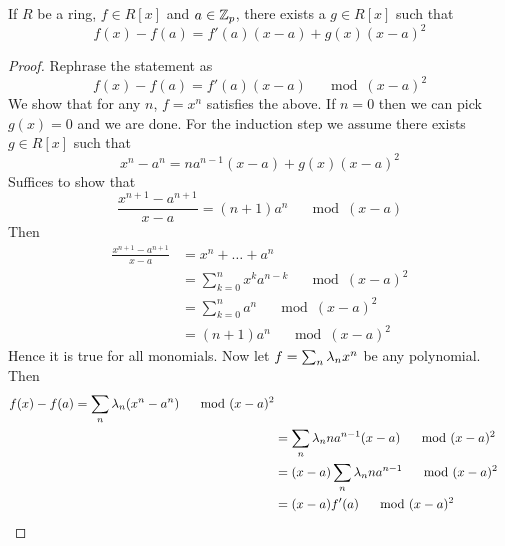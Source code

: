 \begin{prop}
    If $R$ be a ring,
    $f\in R[x]$
    and $a \in \mathbb{Z}_p$,
    there exists a $g \in R[x]$
    such that 
    \[f(x) - f(a) = f'(a)(x - a) + g(x) (x - a)^2\]
\end{prop}
\begin{proof}
    Rephrase the statement as 
    \[f(x) - f(a) = f'(a)(x - a) \quad \mod (x - a)^2\]
    We show that for any $n$, $f = x^n$ satisfies the above.
    If $n = 0$ then we can pick $g(x) = 0$ and we are done.
    For the induction step we assume there exists 
    $g \in R[x]$ such that 
    \[x^n - a^n = n a^{n-1} (x-a) + g(x)(x - a)^2\]
    Suffices to show that 
    \[ \frac{x^{n+1} - a^{n+1}}{x-a}= (n+1) a^n \quad \mod (x - a)\]
    Then \begin{align*}
        \frac{x^{n+1} - a^{n+1}}{x-a}&= x^n + \dots + a^n\\
        &= \sum_{k=0}^n x^k a^{n-k} \quad \mod (x - a)^2\\
        &= \sum_{k=0}^n a^n \quad \mod (x - a)^2\\
        &= (n+1) a^n \quad \mod (x - a)^2
    \end{align*}
    Hence it is true for all monomials.
    Now let $f = \sum_n \lambda_n x^n$ be any polynomial.
    Then 
    \begin{align*}
        f(x) - f(a) = \sum_n \lambda_n (x^n - a^n)\quad \mod (x - a)^2\\
        &= \sum_n \lambda_n n a^{n-1} (x-a)\quad \mod (x - a)^2\\
        &= (x-a) \sum_n \lambda_n n a^{n-1}\quad \mod (x - a)^2\\
        &= (x-a)f'(a)\quad \mod (x - a)^2
    \end{align*}
\end{proof}

